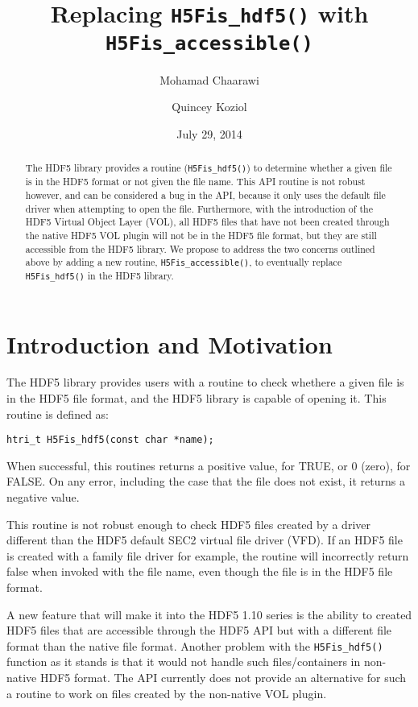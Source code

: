 \documentclass[letterpaper,hyper]{THG_RFC}
\title{Replacing {\tt H5Fis\_hdf5()} with {\tt H5Fis\_accessible()}}
\author{Mohamad Chaarawi}
\author{Quincey Koziol}
\date{July 29, 2014}
\begin{document}
\maketitle

\begin{abstract}
The HDF5 library provides a routine ({\tt H5Fis\_hdf5()}) to determine whether a given file is in the HDF5 format or not given the file name. This API routine is not robust however, and can be considered a bug in the API, because it only uses the default file driver when attempting to open the file. Furthermore, with the introduction of the HDF5 Virtual Object Layer (VOL), all HDF5 files that have not been created through the native HDF5 VOL plugin will not be in the HDF5 file format, but they are still accessible from the HDF5 library. We propose to address the two concerns outlined above by adding a new routine, {\tt H5Fis\_accessible()}, to eventually replace {\tt H5Fis\_hdf5()} in the HDF5 library.
\end{abstract}

\section{Introduction and Motivation}
The HDF5 library provides users with a routine to check whethere a given file is in the HDF5 file format, and the HDF5 library is capable of opening it. This routine is defined as:
\begin{lstlisting}
htri_t H5Fis_hdf5(const char *name);
\end{lstlisting}
When successful, this routines returns a positive value, for TRUE, or 0 (zero), for FALSE. On any error, including the case that the file does not exist, it returns a negative value.

This routine is not robust enough to check HDF5 files created by a driver different than the HDF5 default SEC2 virtual file driver (VFD). If an HDF5 file is created with a family file driver for example, the routine will incorrectly return false when invoked with the file name, even though the file is in the HDF5 file format.

A new feature that will make it into the HDF5 1.10 series is the ability to created HDF5 files that are accessible through the HDF5 API but with a different file format than the native file format. Another problem with the {\tt H5Fis\_hdf5()} function as it stands is that it would not handle such files/containers in non-native HDF5 format. The API currently does not provide an alternative for such a routine to work on files created by the non-native VOL plugin.  
\end{document}
